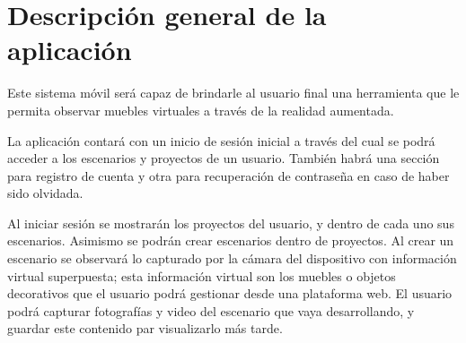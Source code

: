 \section{Descripción general de la aplicación}
Este sistema móvil será capaz de brindarle al usuario final una herramienta que le permita observar muebles virtuales a través de la realidad aumentada.\par

La aplicación contará con un inicio de sesión inicial a través del cual se podrá acceder a los escenarios y proyectos de un usuario. También habrá una sección para registro de cuenta y otra para recuperación de contraseña en caso de haber sido olvidada.\par
Al iniciar sesión se mostrarán los proyectos del usuario, y dentro de cada uno sus escenarios. Asimismo se podrán crear escenarios dentro de proyectos. Al crear un escenario se observará lo capturado por la cámara del dispositivo con información virtual superpuesta; esta información virtual son los muebles o objetos decorativos que el usuario podrá gestionar desde una plataforma web. El usuario podrá capturar fotografías y video del escenario que vaya desarrollando, y guardar este contenido par visualizarlo más tarde.